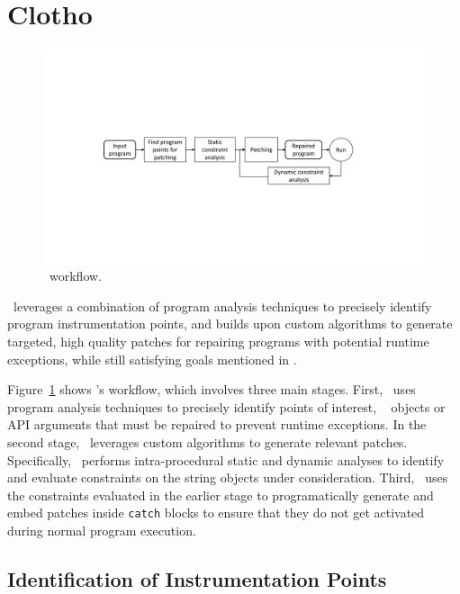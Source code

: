 \section{Clotho}
\label{sec:design}

\begin{figure}[t]
\centering
\includegraphics[scale=.38]{images/NewDesignDiagram.pdf}
\caption{\tool\ workflow.}
\label{fig:overallDesign}
\end{figure}

 \tool\ leverages a combination of program 
analysis techniques to precisely identify program instrumentation points, and
builds upon custom algorithms to generate targeted, high quality patches for
repairing programs with potential runtime exceptions, while still satisfying
goals mentioned in .

Figure~\ref{fig:overallDesign} shows \tool's workflow, which involves three
main stages. First, \tool\ uses program analysis techniques to precisely
identify points of interest, \ie\  objects or API arguments that
must be repaired to prevent runtime exceptions. In the second stage, \tool\ leverages
custom algorithms to generate relevant patches. Specifically, \tool\ performs
intra-procedural static and dynamic analyses to identify and evaluate
constraints on the string objects under consideration. Third, \tool\ uses the
constraints evaluated in the earlier stage to programatically generate and embed
patches inside \texttt{catch} blocks to ensure that they do not get activated
during normal program execution.

\subsection{Identification of Instrumentation Points}
\label{sec:tool:stage1}

